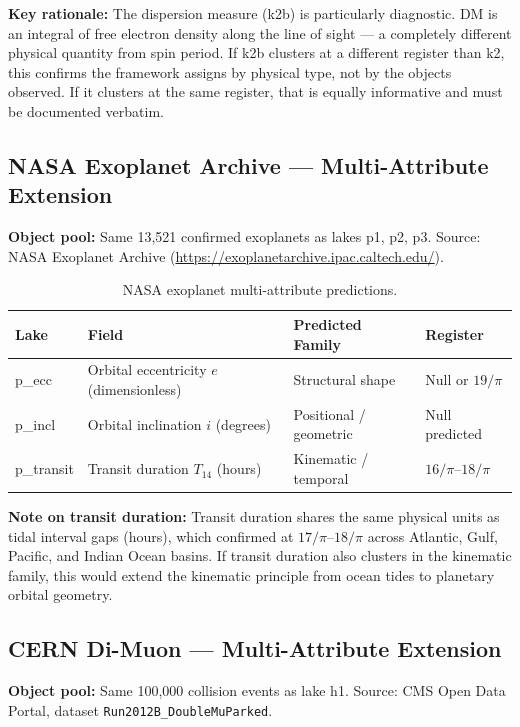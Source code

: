 \documentclass[12pt,a4paper]{article}
\begin{document}
\textbf{Key rationale:} The dispersion measure (k2b) is particularly diagnostic.
DM is an integral of free electron density along the line of sight --- a
completely different physical quantity from spin period. If k2b clusters at a
different register than k2, this confirms the framework assigns by physical
type, not by the objects observed. If it clusters at the same register, that is
equally informative and must be documented verbatim.

\subsection{NASA Exoplanet Archive --- Multi-Attribute Extension}

\textbf{Object pool:} Same 13,521 confirmed exoplanets as lakes p1, p2, p3.
Source: NASA Exoplanet Archive (\url{https://exoplanetarchive.ipac.caltech.edu/}).

\begin{table}[h!]
\centering
\caption{NASA exoplanet multi-attribute predictions.}
\begin{tabular}{lp{4.5cm}p{4cm}l}
\toprule
\textbf{Lake} & \textbf{Field} & \textbf{Predicted Family} & \textbf{Register} \\
\midrule
p\_ecc & Orbital eccentricity $e$ (dimensionless) & Structural shape & Null or $19/\pi$ \\
p\_incl & Orbital inclination $i$ (degrees) & Positional / geometric & Null predicted \\
p\_transit & Transit duration $T_{14}$ (hours) & Kinematic / temporal & $16/\pi$--$18/\pi$ \\
\bottomrule
\end{tabular}
\end{table}

\textbf{Note on transit duration:} Transit duration shares the same physical
units as tidal interval gaps (hours), which confirmed at $17/\pi$--$18/\pi$
across Atlantic, Gulf, Pacific, and Indian Ocean basins. If transit duration
also clusters in the kinematic family, this would extend the kinematic principle
from ocean tides to planetary orbital geometry.

\subsection{CERN Di-Muon --- Multi-Attribute Extension}

\textbf{Object pool:} Same 100,000 collision events as lake h1. Source: CMS
Open Data Portal, dataset \texttt{Run2012B\_DoubleMuParked}.
\end{document}
